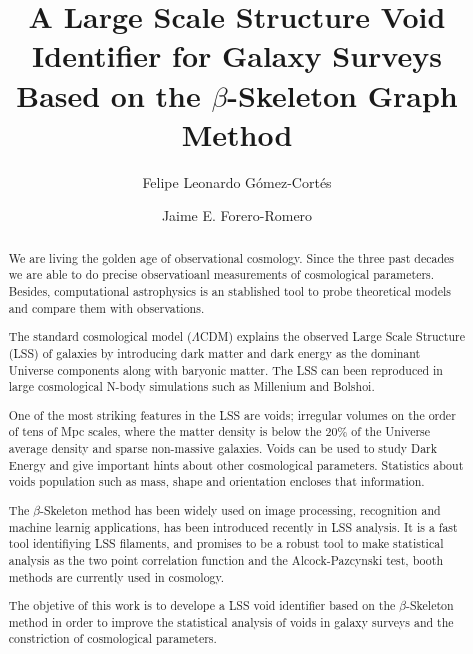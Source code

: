 \documentclass[manuscript]{aastex62}
\begin{document}
\title{A Large Scale Structure Void Identifier for Galaxy Surveys
  Based on the $\beta$-Skeleton Graph Method}


\author{Felipe Leonardo G\'omez-Cort\'es}

\nocollaboration


\author{Jaime E. Forero-Romero}


\begin{abstract}

  We are living the golden age of observational cosmology. Since the three past decades
  we are able to do precise observatioanl measurements of cosmological parameters. 
  Besides, computational astrophysics is an stablished tool to probe theoretical 
  models and compare them with observations.

  The standard cosmological model ($\Lambda$CDM) explains the observed
  Large Scale Structure (LSS) of galaxies by introducing dark matter and
  dark energy as the dominant Universe components along with baryonic matter.
  The LSS can been reproduced in large cosmological N-body simulations
  such as Millenium and Bolshoi.

  One of the most striking features in the LSS are voids; irregular 
  volumes on the order of tens of Mpc scales, where the matter density is below the $20\%$ of the Universe
  average density and sparse non-massive galaxies. Voids can be used 
  to study Dark Energy and give important hints about other
  cosmological parameters. Statistics about voids population such as
  mass, shape and orientation encloses that information.

  The $\beta$-Skeleton method has been widely used on image processing,
  recognition and machine learnig applications, has been introduced
  recently in LSS analysis. It is a fast tool identifiying LSS filaments,
  and promises to be a robust tool to make statistical analysis
  as the two point correlation function and the Alcock-Pazcynski test,
  booth methods are currently used in cosmology.

  The objetive of this work is to develope a LSS void identifier based
  on the $\beta$-Skeleton method in order to improve the statistical
  analysis of voids in galaxy surveys and the constriction of
  cosmological parameters.


  
\end{abstract}
\end{document}
